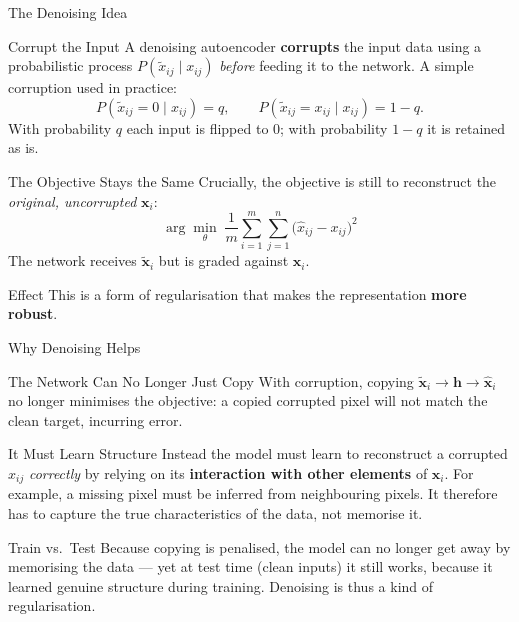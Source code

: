 \documentclass{beamer}
\begin{document}
\begin{frame}[shrink=10]{The Denoising Idea}
  \begin{block}{Corrupt the Input}
    A denoising autoencoder \textbf{corrupts} the input data using a
    probabilistic process $P(\tilde{x}_{ij}\mid x_{ij})$ \emph{before}
    feeding it to the network. A simple corruption used in practice:
    \[
      P(\tilde{x}_{ij}=0\mid x_{ij}) = q,
      \qquad
      P(\tilde{x}_{ij}=x_{ij}\mid x_{ij}) = 1-q.
    \]
    With probability $q$ each input is flipped to $0$; with probability
    $1-q$ it is retained as is.
  \end{block}

  \begin{block}{The Objective Stays the Same}
    Crucially, the objective is still to reconstruct the \emph{original,
    uncorrupted} $\mathbf{x}_i$:
    \[
      \arg\min_{\theta}\;
        \frac{1}{m}\sum_{i=1}^m\sum_{j=1}^n
        \bigl(\hat{x}_{ij} - x_{ij}\bigr)^2
    \]
    The network receives $\tilde{\mathbf{x}}_i$ but is graded against
    $\mathbf{x}_i$.
  \end{block}

  \begin{alertblock}{Effect}
    This is a form of regularisation that makes the representation
    \textbf{more robust}.
  \end{alertblock}
\end{frame}

\begin{frame}[shrink=10]{Why Denoising Helps}
  \begin{block}{The Network Can No Longer Just Copy}
    With corruption, copying $\tilde{\mathbf{x}}_i \to \mathbf{h} \to
    \hat{\mathbf{x}}_i$ no longer minimises the objective: a copied
    corrupted pixel will not match the clean target, incurring error.
  \end{block}

  \begin{block}{It Must Learn Structure}
    Instead the model must learn to reconstruct a corrupted $x_{ij}$
    \emph{correctly} by relying on its \textbf{interaction with other
    elements} of $\mathbf{x}_i$. For example, a missing pixel must be
    inferred from neighbouring pixels. It therefore has to capture the
    true characteristics of the data, not memorise it.
  \end{block}

  \begin{exampleblock}{Train vs.\ Test}
    Because copying is penalised, the model can no longer get away by
    memorising the data --- yet at test time (clean inputs) it still works,
    because it learned genuine structure during training. Denoising is thus
    a kind of regularisation.
  \end{exampleblock}
\end{frame}
\end{document}
